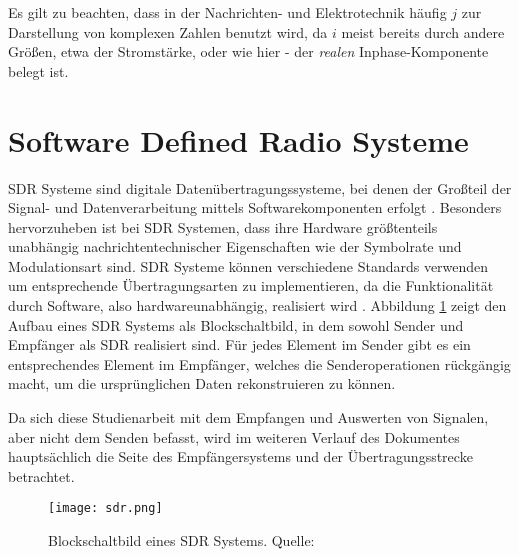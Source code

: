 Es gilt zu beachten, dass in der Nachrichten- und Elektrotechnik häufig $j$ zur Darstellung von komplexen Zahlen benutzt wird, da $i$ meist bereits durch andere Größen, etwa der Stromstärke, oder wie hier - der \textit{realen} Inphase-Komponente belegt ist.
\newpage

\section{Software Defined Radio Systeme} 
\ac{SDR} Systeme sind digitale Datenübertragungssysteme, bei denen der Großteil der Signal- und Datenverarbeitung mittels Softwarekomponenten erfolgt \cite[Heuberger, e. a., S. 1]{Heuberger:2017}.
Besonders hervorzuheben ist bei \ac{SDR} Systemen, dass ihre Hardware größtenteils unabhängig nachrichtentechnischer Eigenschaften wie der Symbolrate und Modulationsart sind. \ac{SDR} Systeme können verschiedene Standards verwenden um entsprechende Übertragungsarten zu implementieren, da die Funktionalität durch Software, also hardwareunabhängig, realisiert wird \cite[Heuberger, e. a., S. 36]{Heuberger:2017}. \newline
Abbildung \ref{sdr-blockschaltbild} zeigt den Aufbau eines \ac{SDR} Systems als Blockschaltbild, in dem sowohl Sender und Empfänger als SDR realisiert sind.
Für jedes Element im Sender gibt es ein entsprechendes Element im Empfänger, welches die Senderoperationen rückgängig macht, um die ursprünglichen Daten rekonstruieren zu können.

Da sich diese Studienarbeit mit dem Empfangen und Auswerten von Signalen, aber nicht dem Senden befasst, wird im weiteren Verlauf des Dokumentes hauptsächlich die Seite des Empfängersystems und der Übertragungsstrecke betrachtet.

\begin{figure}[ht]
	\centering
	\texttt{[image: sdr.png]}
	\caption[Blockschaltbild eines SDR Systems]{Blockschaltbild eines SDR Systems. Quelle: \cite[Heuberger, e. a., S. 37]{Heuberger:2017}}
	\label{sdr-blockschaltbild}
\end{figure}

